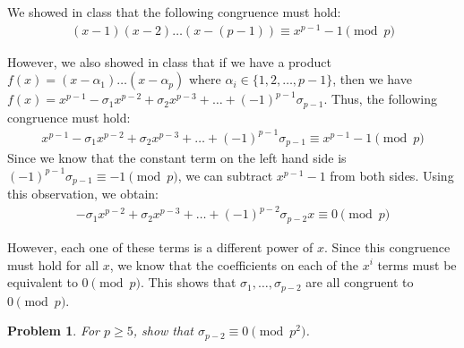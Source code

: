 \documentclass[psamsfonts]{amsart}
\newtheorem{prob}{Problem}[section]
\newenvironment{sol}{{\bfseries Solution}}{\qedsymbol}
\theoremstyle{definition}
\theoremstyle{remark}
\numberwithin{equation}{section}
\begin{document}
\begin{sol}
We showed in class that the following congruence must hold:
\begin{eqnarray}
(x-1)(x-2)\ldots (x - (p-1)) \equiv x^{p-1} - 1 \pmod{p}
\end{eqnarray}

However, we also showed in class that if we have a product $f(x) = (x - \alpha_1)\ldots (x - \alpha_p)$ where $\alpha_i \in \{1,2,\ldots, p-1\}$, then we have $f(x) = x^{p-1} - \sigma_1 x^{p-2} + \sigma_2 x^{p-3} + \ldots + (-1)^{p-1} \sigma_{p-1}$. Thus, the following congruence must hold:
\begin{eqnarray}
x^{p-1} - \sigma_1 x^{p-2} + \sigma_2 x^{p-3} + \ldots + (-1)^{p-1} \sigma_{p-1} \equiv x^{p-1} - 1 \pmod{p} 
\end{eqnarray}
Since we know that the constant term on the left hand side is $(-1)^{p-1} \sigma_{p-1} \equiv -1 \pmod{p}$, we can subtract $x^{p-1} - 1$ from both sides. Using this observation, we obtain:
\begin{eqnarray}
- \sigma_1 x^{p-2} + \sigma_2 x^{p-3} + \ldots + (-1)^{p-2} \sigma_{p-2} x  \equiv 0 \pmod{p}
\end{eqnarray}

However, each one of these terms is a different power of $x$. Since this congruence must hold for all $x$, we know that the coefficients on each of the $x^{i}$ terms must be equivalent to $0 \pmod{p}$. This shows that $\sigma_1, \ldots, \sigma_{p-2}$ are all congruent to $0 \pmod{p}$. 
\end{sol}

\begin{prob}
For $p \geq 5$, show that $\sigma_{p-2} \equiv 0 \pmod{p^2}$. 
\end{prob}
\end{document}
